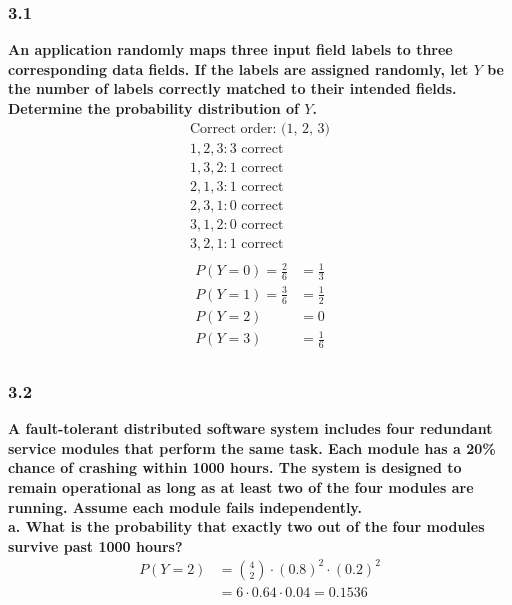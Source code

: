 \documentclass[
	a4paper, %
	10pt, %
	unnumberedsections, %
	twoside, %
]{LTJournalArticle}
\begin{document}
\subsubsection{3.1}
\textbf{An application randomly maps three input field labels to three corresponding data fields. If the labels are assigned randomly, let $Y$ be the number of labels correctly matched to their intended fields. Determine the probability distribution of $Y$.} \\
\begin{equation*}
    \begin{aligned}
        \text{Correct order: (1, 2, 3)} \\
        1, 2, 3: 3 \text{ correct} \\
        1, 3, 2: 1 \text{ correct} \\
        2, 1, 3: 1 \text{ correct} \\
        2, 3, 1: 0 \text{ correct} \\
        3, 1, 2: 0 \text{ correct} \\
        3, 2, 1: 1 \text{ correct} \\
    \end{aligned}
\end{equation*}
\begin{equation*}
    \begin{aligned}
        P(Y = 0) = \frac{2}{6} &= \frac{1}{3} \\
        P(Y = 1) = \frac{3}{6} &= \frac{1}{2} \\
        P(Y = 2) &= 0 \\
        P(Y = 3) &= \frac{1}{6} \\
    \end{aligned}
\end{equation*}
\vspace*{50pt}\noindent
\subsubsection{3.2}
\textbf{A fault-tolerant distributed software system includes four redundant service modules that perform the same task. Each module has a 20\% chance of crashing within 1000 hours. The system is designed to remain operational as long as at least two of the four modules are running. Assume each module fails independently.} \\

\textbf{a. What is the probability that exactly two out of the four modules survive past 1000 hours?} \\
\begin{equation*}
    \begin{aligned}
        P(Y = 2) &= \binom{4}{2} \cdot (0.8)^2 \cdot (0.2)^2 \\ 
        &= 6 \cdot 0.64 \cdot 0.04 = 0.1536 \\
    \end{aligned}
\end{equation*} \\
\end{document}
